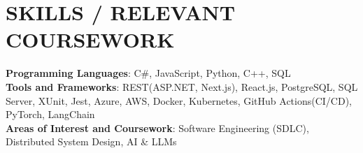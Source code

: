 \documentclass[letterpaper,11pt]{article}
\newcommand{\SectionListBegin}{\begin{itemize}[leftmargin=0.15in, label={}]}
\newcommand{\SectionListEnd}{\end{itemize}}
\newcommand{\swallow}[1]{}
\begin{document}
\section{SKILLS / RELEVANT COURSEWORK}
  \SectionListBegin
    \small{\item{
    \vspace{1mm}
     \textbf{Programming Languages}{: C\#, JavaScript, Python, C++, SQL} \\
     \vspace{1mm}
     \textbf{Tools and Frameworks}{: REST(ASP.NET, Next.js), React.js, PostgreSQL, SQL Server, XUnit, Jest, Azure, AWS, Docker, Kubernetes, GitHub Actions(CI/CD), PyTorch, LangChain}\\
     \vspace{1mm}
     \textbf{Areas of Interest and Coursework}{:  Software Engineering (SDLC), Distributed System Design, AI \& LLMs \swallow{Data Structures \& Algorithms,Object Oriented Design (OOD), Computer Architecture}} \\
     \vspace{1mm}
    }}
  \SectionListEnd

\end{document}
